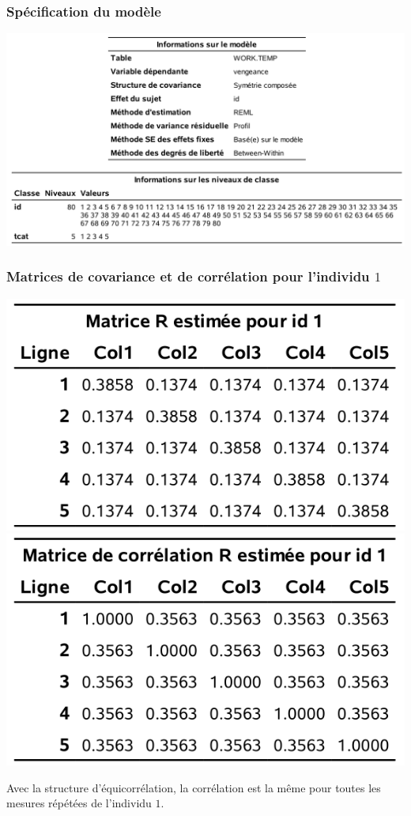 \documentclass{beamer}
\begin{document}
\begin{frame}[fragile]
\frametitle{Spécification du modèle}
\begin{center}
\includegraphics[width = \linewidth]{img/c5/diapos6-e06}
\end{center}
\end{frame}
\begin{frame}[fragile]
\frametitle{Matrices de covariance et de corrélation pour l'individu $1$}
\begin{center}
\includegraphics[width = 0.45\linewidth]{img/c5/diapos6-e07a}
\includegraphics[width = 0.45\linewidth]{img/c5/diapos6-e07b}
\end{center}
Avec la structure d'équicorrélation, la corrélation est la même pour toutes les mesures répétées de l'individu $1$.

\end{frame}
\end{document}
